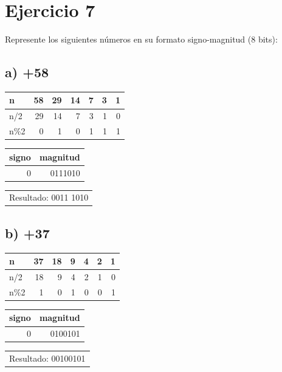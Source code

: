 \documentclass[12pt]{article}
\begin{document}
\section*{Ejercicio 7}
\label{sec:orge93cfde}
Represente los siguientes números en su formato signo-magnitud (8 bits):

\subsection*{a) +58}
\label{sec:org5c3fdf7}
\begin{mdframed}
\begin{center}
\begin{tabular}{lrrrrrr}
n & 58 & 29 & 14 & 7 & 3 & 1\\
\hline
n/2 & 29 & 14 & 7 & 3 & 1 & 0\\
n\%2 & 0 & 1 & 0 & 1 & 1 & 1\\
\end{tabular}
\end{center}

\begin{center}
\begin{tabular}{rr}
signo & magnitud\\
\hline
0 & 0111010\\
\end{tabular}
\end{center}

\begin{center}
\begin{tabular}{l}
Resultado: 0011 1010\\
\end{tabular}
\end{center}
\end{mdframed}

\subsection*{b) +37}
\label{sec:orgcb50bef}
\begin{mdframed}
\begin{center}
\begin{tabular}{lrrrrrr}
n & 37 & 18 & 9 & 4 & 2 & 1\\
\hline
n/2 & 18 & 9 & 4 & 2 & 1 & 0\\
n\%2 & 1 & 0 & 1 & 0 & 0 & 1\\
\end{tabular}
\end{center}

\begin{center}
\begin{tabular}{rr}
signo & magnitud\\
\hline
0 & 0100101\\
\end{tabular}
\end{center}

\begin{center}
\begin{tabular}{l}
Resultado: 00100101\\
\end{tabular}
\end{center}
\end{mdframed}
\end{document}

